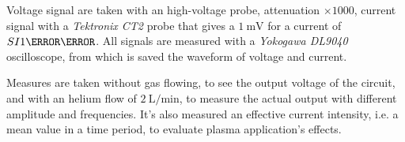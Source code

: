 Voltage signal are taken with an high-voltage probe, attenuation $\times 1000$, current signal with a \emph{Tektronix CT2} probe that gives a $\SI{1}{\milli\volt}$ for a current of $SI{1}{\milli\ampere}$. All signals are measured with a \emph{Yokogawa DL9040} oscilloscope, from which is saved the waveform of voltage and current.

Measures are taken without gas flowing, to see the output voltage of the circuit, and with an helium flow of $\SI{2}{\liter/\minute}$, to measure the actual output with different amplitude and frequencies. It's also measured an effective current intensity, i.e. a mean value in a time period, to evaluate plasma application's effects.

